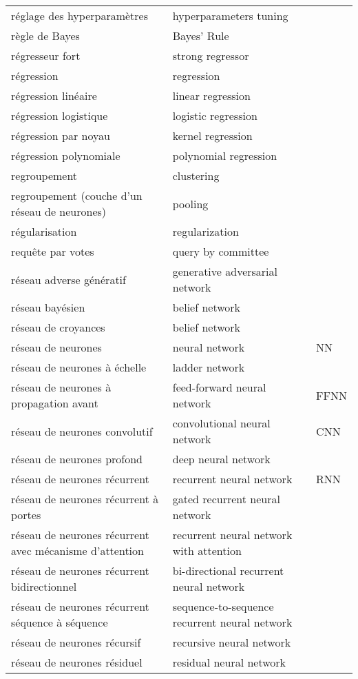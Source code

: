 \begin{longtable}{p{} p{} p{}}
réglage des hyperparamètres & hyperparameters tuning &  \\ 
règle de Bayes & Bayes’ Rule &  \\ 
régresseur fort & strong regressor &  \\ 
régression & regression &  \\ 
régression linéaire & linear regression &  \\ 
régression logistique & logistic regression &  \\ 
régression par noyau & kernel regression &  \\ 
régression polynomiale & polynomial regression &  \\ 
regroupement & clustering &  \\ 
regroupement (couche d'un réseau de neurones) & pooling &  \\ 
régularisation & regularization &  \\ 
requête par votes & query by committee &  \\ 
réseau adverse génératif & generative adversarial network &  \\ 
réseau bayésien & belief network &  \\ 
réseau de croyances & belief network &  \\ 
réseau de neurones & neural network & NN \\ 
réseau de neurones à échelle & ladder network &  \\ 
réseau de neurones à propagation avant & feed-forward neural network & FFNN \\ 
réseau de neurones convolutif & convolutional neural network & CNN \\ 
réseau de neurones profond & deep neural network &  \\ 
réseau de neurones récurrent & recurrent neural network & RNN \\ 
réseau de neurones récurrent à portes & gated recurrent neural network &  \\ 
réseau de neurones récurrent avec mécanisme d’attention & recurrent neural network with attention &  \\ 
réseau de neurones récurrent bidirectionnel & bi-directional recurrent neural network &  \\ 
réseau de neurones récurrent séquence à séquence & sequence-to-sequence recurrent neural network &  \\ 
réseau de neurones récursif & recursive neural network &  \\ 
réseau de neurones résiduel & residual neural network &  \\ 

\end{longtable}

